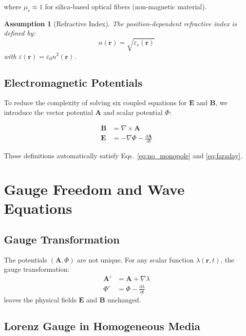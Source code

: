 \documentclass[12pt,a4paper]{article}
\newtheorem{assumption}{Assumption}
\begin{document}
where $\mu_r \approx 1$ for silica-based optical fibers (non-magnetic material).

\begin{assumption}[Refractive Index]
The position-dependent refractive index is defined by:
\begin{equation}
n(\mathbf{r}) = \sqrt{\varepsilon_r(\mathbf{r})}
\end{equation}
with $\varepsilon(\mathbf{r}) = \varepsilon_0 n^2(\mathbf{r})$.
\end{assumption}

\subsection{Electromagnetic Potentials}

To reduce the complexity of solving six coupled equations for $\mathbf{E}$ and $\mathbf{B}$, we introduce the vector potential $\mathbf{A}$ and scalar potential $\Phi$:

\begin{align}
\mathbf{B} &= \nabla \times \mathbf{A} \label{eq:B_potential}\\
\mathbf{E} &= -\nabla \Phi - \frac{\partial \mathbf{A}}{\partial t} \label{eq:E_potential}
\end{align}

These definitions automatically satisfy Eqs.~\eqref{eq:no_monopole} and \eqref{eq:faraday}.

\section{Gauge Freedom and Wave Equations}

\subsection{Gauge Transformation}

The potentials $(\mathbf{A}, \Phi)$ are not unique. For any scalar function $\lambda(\mathbf{r},t)$, the gauge transformation:
\begin{align}
\mathbf{A}' &= \mathbf{A} + \nabla \lambda \label{eq:gauge_A}\\
\Phi' &= \Phi - \frac{\partial \lambda}{\partial t} \label{eq:gauge_Phi}
\end{align}
leaves the physical fields $\mathbf{E}$ and $\mathbf{B}$ unchanged.

\subsection{Lorenz Gauge in Homogeneous Media}
\end{document}
